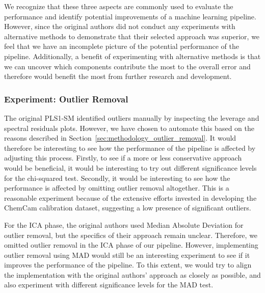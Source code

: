 \noindent
We recognize that these three aspects are commonly used to evaluate the performance and identify potential improvements of a machine learning pipeline.
However, since the original authors did not conduct any experiments with alternative methods to demonstrate that their selected approach was superior, we feel that we have an incomplete picture of the potential performance of the pipeline.
Additionally, a benefit of experimenting with alternative methods is that we can uncover which components contribute the most to the overall error and therefore would benefit the most from further research and development.


\subsubsection{Experiment: Outlier Removal}\label{sec:experiment_outlier_removal}
The original PLS1-SM identified outliers manually by inspecting the leverage and spectral residuals plots.
However, we have chosen to automate this based on the reasons described in Section~\ref{sec:methodology_outlier_removal}.
It would therefore be interesting to see how the performance of the pipeline is affected by adjusting this process.
Firstly, to see if a more or less conservative approach would be beneficial, it would be interesting to try out different significance levels for the chi-squared test.
Secondly, it would be interesting to see how the performance is affected by omitting outlier removal altogether.
This is a reasonable experiment because of the extensive efforts invested in developing the ChemCam calibration dataset, suggesting a low presence of significant outliers.

For the ICA phase, the original authors used Median Absolute Deviation for outlier removal, but the specifics of their approach remain unclear.
Therefore, we omitted outlier removal in the ICA phase of our pipeline.
However, implementing outlier removal using MAD would still be an interesting experiment to see if it improves the performance of the pipeline.
To this extent, we would try to align the implementation with the original authors' approach as closely as possible, and also experiment with different significance levels for the MAD test.


